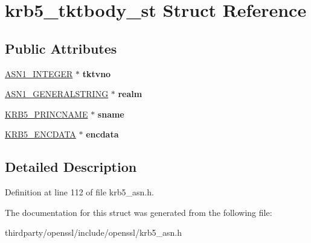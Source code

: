 \hypertarget{structkrb5__tktbody__st}{}\section{krb5\+\_\+tktbody\+\_\+st Struct Reference}
\label{structkrb5__tktbody__st}
\subsection*{Public Attributes}
\begin{DoxyCompactItemize}
\item 
\mbox{\label{structkrb5__tktbody__st_ab08375dff74a8c2325a6f513a57db966}} 
\hyperlink{structasn1__string__st}{A\+S\+N1\+\_\+\+I\+N\+T\+E\+G\+ER} $\ast$ {\bfseries tktvno}
\item 
\mbox{\label{structkrb5__tktbody__st_afda45dfe18a1811139bec0b5ef92f279}} 
\hyperlink{structasn1__string__st}{A\+S\+N1\+\_\+\+G\+E\+N\+E\+R\+A\+L\+S\+T\+R\+I\+NG} $\ast$ {\bfseries realm}
\item 
\mbox{\label{structkrb5__tktbody__st_a2348d5ac085e82390778933a463d9333}} 
\hyperlink{structkrb5__princname__st}{K\+R\+B5\+\_\+\+P\+R\+I\+N\+C\+N\+A\+ME} $\ast$ {\bfseries sname}
\item 
\mbox{\label{structkrb5__tktbody__st_af8a772eee7b3423d1d48926ca5dfea20}} 
\hyperlink{structkrb5__encdata__st}{K\+R\+B5\+\_\+\+E\+N\+C\+D\+A\+TA} $\ast$ {\bfseries encdata}
\end{DoxyCompactItemize}


\subsection{Detailed Description}


Definition at line 112 of file krb5\+\_\+asn.\+h.



The documentation for this struct was generated from the following file\+:\begin{DoxyCompactItemize}
\item 
thirdparty/openssl/include/openssl/krb5\+\_\+asn.\+h\end{DoxyCompactItemize}
